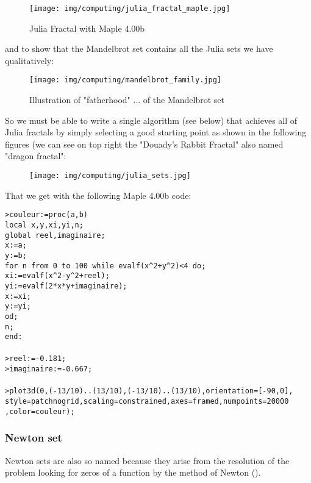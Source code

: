 	\begin{figure}[H]
		\centering
		\texttt{[image: img/computing/julia\_fractal\_maple.jpg]}
		\caption{Julia Fractal with Maple 4.00b}
	\end{figure}
	and to show that the Mandelbrot set contains all the Julia sets we have qualitatively:
	\begin{figure}[H]
		\centering
		\texttt{[image: img/computing/mandelbrot\_family.jpg]}
		\caption{Illustration of "fatherhood" ... of the Mandelbrot set}
	\end{figure}
	So we must be able to write a single algorithm (see below) that achieves all of Julia fractals by simply selecting a good starting point as shown in the following figures (we can see on top right the "Douady's Rabbit Fractal" also named "dragon fractal":
	\begin{figure}[H]
		\centering
		\texttt{[image: img/computing/julia\_sets.jpg]}
	\end{figure}
	That we get with the following Maple 4.00b  code:
	
	\texttt{>couleur:=proc(a,b)\\
	local x,y,xi,yi,n;\\
	global reel,imaginaire;\\
	x:=a;\\
	y:=b;\\
	for n from 0 to 100 while evalf(x\string^2+y\string^2)<4 do;\\
	xi:=evalf(x\string^2-y\string^2+reel);\\
	yi:=evalf(2*x*y+imaginaire);\\
	x:=xi;\\
	y:=yi;\\
	od;\\
	n;\\
	end:\\\\
	>reel:=-0.181;\\
	>imaginaire:=-0.667;\\\\
	>plot3d(0,(-13/10)..(13/10),(-13/10)..(13/10),orientation=[-90,0], style=patchnogrid,scaling=constrained,axes=framed,numpoints=20000
	,color=couleur);\\}
	
	\subsubsection{Newton set}
	Newton sets are also so named because they arise from the resolution of the problem looking for zeros of a function by the method of Newton ().

